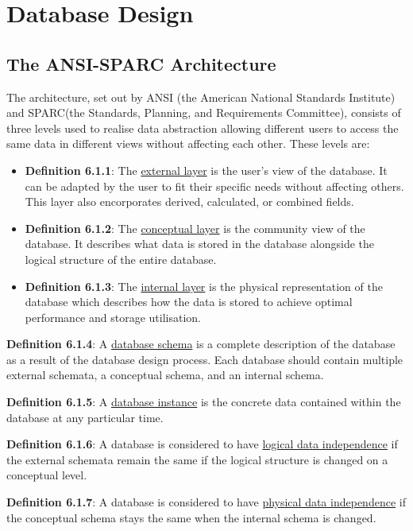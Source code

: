 \documentclass{article}
\newcommand{\separate}[1] {\vspace{#1 pt}\noindent}
\newcommand{\definition}[2]{\textbf{Definition #1}: #2\label{def:#1}}
\begin{document}
\section{Database Design}

\subsection{The ANSI-SPARC Architecture}

The architecture, set out by ANSI (the American National Standards Institute) and SPARC(the Standards, Planning, and Requirements Committee), consists of three levels used to realise data abstraction allowing different users to access the same data in different views without affecting each other. These levels are:
\begin{itemize}
    \item \definition{6.1.1}{The \underline{external layer} is the user's view of the database. It can be adapted by the user to fit their specific needs without affecting others. This layer also encorporates derived, calculated, or combined fields.}
    \item \definition{6.1.2}{The \underline{conceptual layer} is the community view of the database. It describes what data is stored in the database alongside the logical structure of the entire database.}
    \item \definition{6.1.3}{The \underline{internal layer} is the physical representation of the database which describes how the data is stored to achieve optimal performance and storage utilisation.}
\end{itemize}

\separate{7}\definition{6.1.4}{A \underline{database schema} is a complete description of the database as a result of the database design process. Each database should contain multiple external schemata, a conceptual schema, and an internal schema.}

\separate{7}\definition{6.1.5}{A \underline{database instance} is the concrete data contained within the database at any particular time.}

\separate{7}\definition{6.1.6}{A database is considered to have \underline{logical data independence} if the external schemata remain the same if the logical structure is changed on a conceptual level.}

\separate{7}\definition{6.1.7}{A database is considered to have \underline{physical data independence} if the conceptual schema stays the same when the internal schema is changed.}
\end{document}
